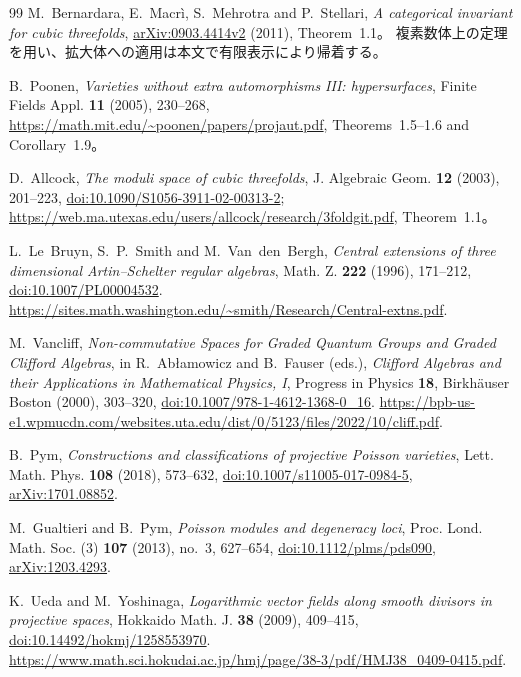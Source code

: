 \documentclass[11pt,a4paper]{ltjsarticle}
\numberwithin{equation}{section}
\begin{document}
\begin{thebibliography}{99}
M.~Bernardara, E.~Macr\`i, S.~Mehrotra and P.~Stellari,
\emph{A categorical invariant for cubic threefolds},
\href{https://arxiv.org/abs/0903.4414v2}{arXiv:0903.4414v2} (2011), Theorem~1.1。
複素数体上の定理を用い、拡大体への適用は本文で有限表示により帰着する。

B.~Poonen, \emph{Varieties without extra automorphisms III: hypersurfaces},
Finite Fields Appl. \textbf{11} (2005), 230--268,
\url{https://math.mit.edu/~poonen/papers/projaut.pdf},
Theorems~1.5--1.6 and Corollary~1.9。

D.~Allcock, \emph{The moduli space of cubic threefolds},
J. Algebraic Geom. \textbf{12} (2003), 201--223,
\href{https://doi.org/10.1090/S1056-3911-02-00313-2}{doi:10.1090/S1056-3911-02-00313-2};
\url{https://web.ma.utexas.edu/users/allcock/research/3foldgit.pdf}, Theorem~1.1。


L.~Le~Bruyn, S.~P.~Smith and M.~Van~den~Bergh,
\textit{Central extensions of three dimensional Artin--Schelter regular algebras},
Math. Z. \textbf{222} (1996), 171--212,
\href{https://doi.org/10.1007/PL00004532}{doi:10.1007/PL00004532}.
\url{https://sites.math.washington.edu/~smith/Research/Central-extns.pdf}.

M.~Vancliff,
\textit{Non-commutative Spaces for Graded Quantum Groups and Graded Clifford Algebras},
in R.~Ab{\l}amowicz and B.~Fauser (eds.),
\textit{Clifford Algebras and their Applications in Mathematical Physics, I},
Progress in Physics \textbf{18}, Birkh\"auser Boston (2000), 303--320,
\href{https://doi.org/10.1007/978-1-4612-1368-0_16}{doi:10.1007/978-1-4612-1368-0\_16}.
\url{https://bpb-us-e1.wpmucdn.com/websites.uta.edu/dist/0/5123/files/2022/10/cliff.pdf}.

B.~Pym,
\textit{Constructions and classifications of projective Poisson varieties},
Lett. Math. Phys. \textbf{108} (2018), 573--632,
\href{https://doi.org/10.1007/s11005-017-0984-5}{doi:10.1007/s11005-017-0984-5},
\href{https://arxiv.org/abs/1701.08852}{arXiv:1701.08852}.

M.~Gualtieri and B.~Pym,
\textit{Poisson modules and degeneracy loci},
Proc. Lond. Math. Soc. (3) \textbf{107} (2013), no.~3, 627--654,
\href{https://doi.org/10.1112/plms/pds090}{doi:10.1112/plms/pds090},
\href{https://arxiv.org/abs/1203.4293}{arXiv:1203.4293}.

K.~Ueda and M.~Yoshinaga,
\textit{Logarithmic vector fields along smooth divisors in projective spaces},
Hokkaido Math. J. \textbf{38} (2009), 409--415,
\href{https://doi.org/10.14492/hokmj/1258553970}{doi:10.14492/hokmj/1258553970}.
\url{https://www.math.sci.hokudai.ac.jp/hmj/page/38-3/pdf/HMJ38_0409-0415.pdf}.


\end{thebibliography}
\end{document}
